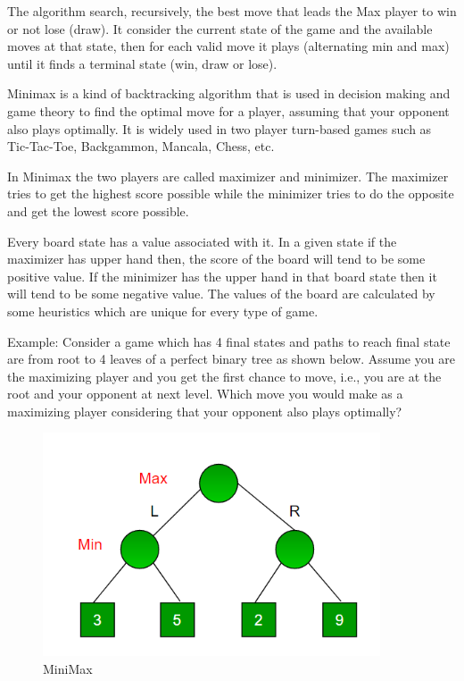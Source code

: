 \documentclass[11pt]{article}
\begin{document}
The algorithm search, recursively, the best move that leads the Max
player to win or not lose (draw). It consider the current state of the
game and the available moves at that state, then for each valid move it
plays (alternating min and max) until it finds a terminal state (win,
draw or lose).

Minimax is a kind of backtracking algorithm that is used in decision
making and game theory to find the optimal move for a player, assuming
that your opponent also plays optimally. It is widely used in two player
turn-based games such as Tic-Tac-Toe, Backgammon, Mancala, Chess, etc.

In Minimax the two players are called maximizer and minimizer. The
maximizer tries to get the highest score possible while the minimizer
tries to do the opposite and get the lowest score possible.

Every board state has a value associated with it. In a given state if
the maximizer has upper hand then, the score of the board will tend to
be some positive value. If the minimizer has the upper hand in that
board state then it will tend to be some negative value. The values of
the board are calculated by some heuristics which are unique for every
type of game.

Example: Consider a game which has 4 final states and paths to reach
final state are from root to 4 leaves of a perfect binary tree as shown
below. Assume you are the maximizing player and you get the first chance
to move, i.e., you are at the root and your opponent at next level.
Which move you would make as a maximizing player considering that your
opponent also plays optimally?

\begin{figure}
\centering
\includegraphics[width=10cm]{assets/example1.png}
\caption{MiniMax}
\end{figure}
\end{document}
